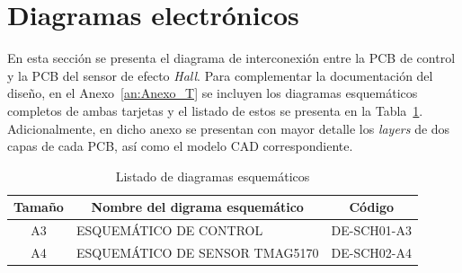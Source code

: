 \section{Diagramas electrónicos}

    \noindent
    En esta sección se presenta el diagrama de interconexión entre la \ac{PCB} de control y la \ac{PCB} del sensor de efecto \textit{Hall}. Para complementar la documentación del diseño, en el Anexo~\ref{an:Anexo_T} se incluyen los diagramas esquemáticos completos de ambas tarjetas y el listado de estos se presenta en la Tabla~\ref{tab:diagramas_esquematicos}. Adicionalmente, en dicho anexo se presentan con mayor detalle los \textit{layers} de dos capas de cada \ac{PCB}, así como el modelo \ac{CAD} correspondiente.

\begin{table}[H]
\centering
\caption{Listado de diagramas esquemáticos}
\label{tab:diagramas_esquematicos}
\begin{tabular}{|c|l|c|}
\hline
Tamaño & \multicolumn{1}{c|}{Nombre del digrama esquemático} & \multicolumn{1}{c|}{Código} \\
\hline
A3 & ESQUEMÁTICO DE CONTROL & DE-SCH01-A3 \\
\hline
A4 & ESQUEMÁTICO DE SENSOR TMAG5170 & DE-SCH02-A4 \\
\hline
\end{tabular}
\end{table}
